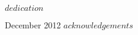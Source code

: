 \frontmatter

\signaturepage


\begin{dedication} %
  $dedication$
\end{dedication}

\maketitle

\begin{acks}{December 2012} %
  $acknowledgements$
\end{acks}

\begin{abstract}
  $abstract$
\end{abstract}

\tableofcontents
\listoffigures %
\listoftables %

\mainmatter

